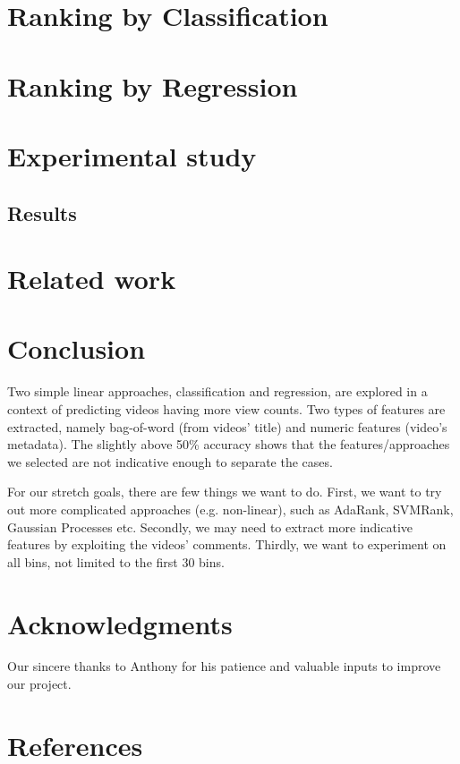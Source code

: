 \documentclass{article} %
\begin{document}
\section{Ranking by Classification}
\label{sec:ranking}
	
\section{Ranking by Regression}
\label{sec:regression}
	
\section{Experimental study}
\label{sec:experiment}
	
\subsection{Results}
\label{sec:results}
	
\section{Related work}
\label{sec:related}
	
\section{Conclusion}
Two simple linear approaches, classification and regression, are explored in a context of predicting videos having more view counts. Two types of features are extracted, namely bag-of-word (from videos' title) and numeric features (video's metadata). The slightly above 50\% accuracy shows that the features/approaches we selected are not indicative enough to separate the cases. 

For our stretch goals, there are few things we want to do. First, we want to try out more complicated approaches (e.g. non-linear), such as AdaRank, SVMRank, Gaussian Processes etc. Secondly, we may need to extract more indicative features by exploiting the videos' comments. Thirdly, we want to experiment on all bins, not limited to the first 30 bins.

\section*{Acknowledgments}
	Our sincere thanks to Anthony for his patience and valuable inputs to improve our project.

\section*{References}
\label{sec:references}
	
\end{document}
